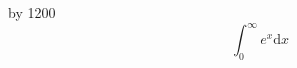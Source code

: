 \documentclass[preview,border={0pt 5pt 0pt 0pt}]{standalone}
\begin{document}
\pdfpxdimen=1in
\divide\pdfpxdimen by 1200
\begin{equation}
\int_0^{\infty} e^x \mathrm{d} x
\end{equation}
\end{document}
